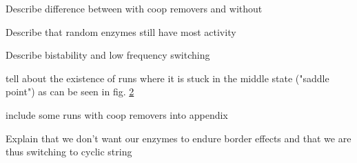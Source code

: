 
            \begin{figure}[htpb!]
                \centering
                \caption{}
                \label{img:nonCyclBistability_runPlot2}
            \end{figure}
            \begin{figure}[htpb!]
                \centering
                \caption{}
                \label{img:nonCyclBistability_runPlot3}
            \end{figure}
            \begin{itemize}
                {
                    \color{red}
                    \item Describe difference between with coop removers and without
                    \item Describe that random enzymes still have most activity
                    \item Describe bistability and low frequency switching
                    \item tell about the existence of runs where it is stuck in the middle state ("saddle point") as can be seen in fig. \ref{img:nonCyclBistability_runPlot3}
                    \item include some runs with coop removers into appendix
                    \item Explain that we don't want our enzymes to endure border effects and that we are thus switching to cyclic string
                }
            \end{itemize}
    \newpage

